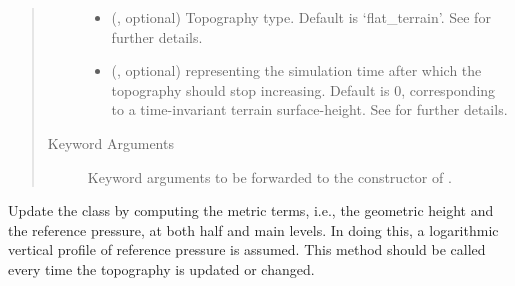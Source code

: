 \documentclass[letterpaper,10pt,english]{sphinxmanual}
\begin{document}
\begin{fulllineitems}
\begin{fulllineitems}
\begin{quote}
\begin{description}
\begin{itemize}
\item {} 
 (, optional) \textendash{} Topography type. Default is ‘flat\_terrain’. See {\hyperref[\detokenize{api:module-tasmania.grids.topography}]{}} for further details.

\item {} 
 (, optional) \textendash{}  representing the simulation time after which the topography should stop increasing.
Default is 0, corresponding to a time-invariant terrain surface-height. See {\hyperref[\detokenize{api:module-tasmania.grids.topography}]{}}
for further details.

\end{itemize}

\item[{Keyword Arguments}] \leavevmode
{} \textendash{} Keyword arguments to be forwarded to the constructor of {\hyperref[\detokenize{api:tasmania.grids.topography.Topography1d}]{}}.

\end{description}\end{quote}

\end{fulllineitems}


\begin{fulllineitems}
\label{\detokenize{api:tasmania.grids.gal_chen.GalChen2d._update_metric_terms}}
Update the class by computing the metric terms, i.e., the geometric height and the reference pressure,
at both half and main levels. In doing this, a logarithmic vertical profile of reference pressure is assumed.
This method should be called every time the topography is updated or changed.

\end{fulllineitems}



\end{fulllineitems}
\end{document}
